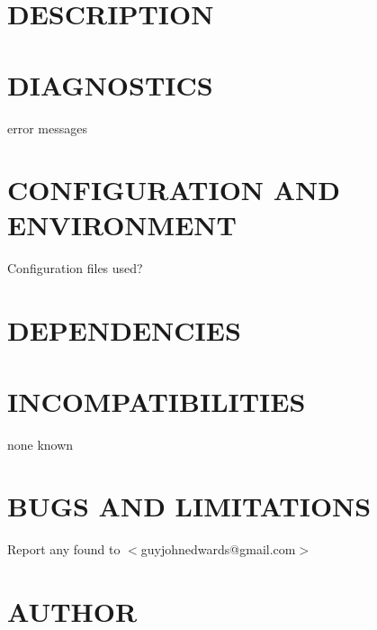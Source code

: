 \documentclass{book}
\begin{document}
\section{DESCRIPTION}
\label{_DESCRIPTION}
\hypertarget{_DESCRIPTION}{}


\section{DIAGNOSTICS}
\label{_DIAGNOSTICS}
\hypertarget{_DIAGNOSTICS}{}



error messages


\section{CONFIGURATION AND ENVIRONMENT}
\label{_CONFIGURATION_AND_ENVIRONMENT}
\hypertarget{_CONFIGURATION_AND_ENVIRONMENT}{}



Configuration files used?


\section{DEPENDENCIES}
\label{_DEPENDENCIES}
\hypertarget{_DEPENDENCIES}{}


\section{INCOMPATIBILITIES}
\label{_INCOMPATIBILITIES}
\hypertarget{_INCOMPATIBILITIES}{}



none known


\section{BUGS AND LIMITATIONS}
\label{_BUGS_AND_LIMITATIONS}
\hypertarget{_BUGS_AND_LIMITATIONS}{}



Report any found to $<$guyjohnedwards@gmail.com$>$


\section{AUTHOR}
\label{_AUTHOR}
\hypertarget{_AUTHOR}{}
\end{document}
